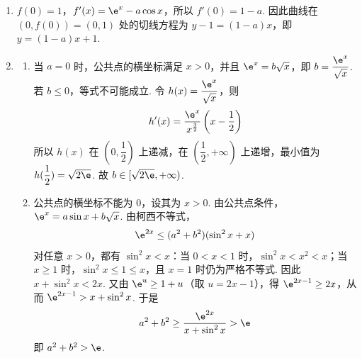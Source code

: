 \begin{solution}
\begin{enumerate}
\item \(f(0)=1\)，\(f'(x)=\e^x-a\cos x\)，所以 \(f'(0)=1-a\). 因此曲线在 \((0,f(0))=(0,1)\) 处的切线方程为 \(y-1=(1-a)x\)，即 \(y=(1-a)x+1\).
\item
    \begin{enumerate}
    \item 当 \(a=0\) 时，公共点的横坐标满足 \(x>0\)，并且 \(\e^x=b\sqrt{x}\)，即 \(b=\dfrac{\e^x}{\sqrt{x}}\). 若 \(b\le0\)，等式不可能成立. 令 \(h(x)=\dfrac{\e^x}{\sqrt{x}}\)，则
    \[
    h'(x)=\dfrac{\e^x}{x^{\frac{3}{2}}}\left(x-\dfrac12\right)
    \]
    所以 \(h(x)\) 在 \((0,\dfrac12)\) 上递减，在 \((\dfrac12,+\infty)\) 上递增，最小值为 \(h(\dfrac12)=\sqrt{2\e}\). 故 \(b\in[\sqrt{2\e},+\infty)\).
    \item 公共点的横坐标不能为 \(0\)，设其为 \(x>0\). 由公共点条件，\(\e^x=a\sin x+b\sqrt{x}\). 由柯西不等式，
    \[
    \e^{2x}\le(a^2+b^2)(\sin^2x+x)
    \]
    对任意 \(x>0\)，都有 \(\sin^2x<x\)：当 \(0<x<1\) 时，\(\sin^2x<x^2<x\)；当 \(x\ge1\) 时，\(\sin^2x\le1\le x\)，且 \(x=1\) 时仍为严格不等式. 因此 \(x+\sin^2x<2x\). 又由 \(\e^u\ge1+u\)（取 \(u=2x-1\)），得 \(\e^{2x-1}\ge2x\)，从而 \(\e^{2x-1}>x+\sin^2x\). 于是
    \[
    a^2+b^2\ge\dfrac{\e^{2x}}{x+\sin^2x}>\e
    \]
    即 \(a^2+b^2>\e\).
    \end{enumerate}
\end{enumerate}
\end{solution}
